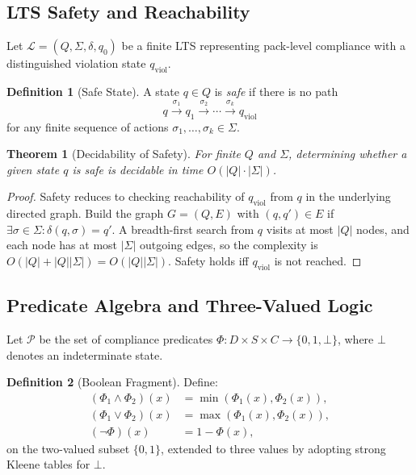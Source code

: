 \documentclass[12pt,letterpaper]{article}
\theoremstyle{definition}
\newtheorem{definition}{Definition}[section]
\theoremstyle{plain}
\newtheorem{theorem}{Theorem}[section]
\theoremstyle{remark}
\begin{document}
\subsection{LTS Safety and Reachability}
\label{subsec:lts-safety}

Let \(\mathcal{L} = (Q, \Sigma, \delta, q_0)\) be a finite LTS representing pack-level compliance with a distinguished violation state \(q_{\mathrm{viol}}\).

\begin{definition}[Safe State]
A state \(q \in Q\) is \emph{safe} if there is no path
\[
q \xrightarrow{\sigma_1} q_1 \xrightarrow{\sigma_2} \cdots \xrightarrow{\sigma_k} q_{\mathrm{viol}}
\]
for any finite sequence of actions \(\sigma_1,\dots,\sigma_k \in \Sigma\).
\end{definition}

\begin{theorem}[Decidability of Safety]
For finite \(Q\) and \(\Sigma\), determining whether a given state \(q\) is safe is decidable in time \(O(|Q|\cdot|\Sigma|)\).
\end{theorem}

\begin{proof}
Safety reduces to checking reachability of \(q_{\mathrm{viol}}\) from \(q\) in the underlying directed graph. Build the graph \(G=(Q,E)\) with \((q,q') \in E\) if \(\exists \sigma \in \Sigma : \delta(q,\sigma) = q'\). A breadth-first search from \(q\) visits at most \(|Q|\) nodes, and each node has at most \(|\Sigma|\) outgoing edges, so the complexity is \(O(|Q| + |Q||\Sigma|) = O(|Q||\Sigma|)\). Safety holds iff \(q_{\mathrm{viol}}\) is not reached.
\end{proof}

\subsection{Predicate Algebra and Three-Valued Logic}
\label{subsec:pred-algebra}

Let \(\mathcal{P}\) be the set of compliance predicates \(\Phi : D \times S \times C \to \{0,1,\bot\}\), where \(\bot\) denotes an indeterminate state.

\begin{definition}[Boolean Fragment]
Define:
\begin{align*}
(\Phi_1 \wedge \Phi_2)(x) &= \min(\Phi_1(x), \Phi_2(x)), \\
(\Phi_1 \vee \Phi_2)(x) &= \max(\Phi_1(x), \Phi_2(x)), \\
(\neg \Phi)(x) &= 1 - \Phi(x),
\end{align*}
on the two-valued subset \(\{0,1\}\), extended to three values by adopting strong Kleene tables for \(\bot\).
\end{definition}
\end{document}
